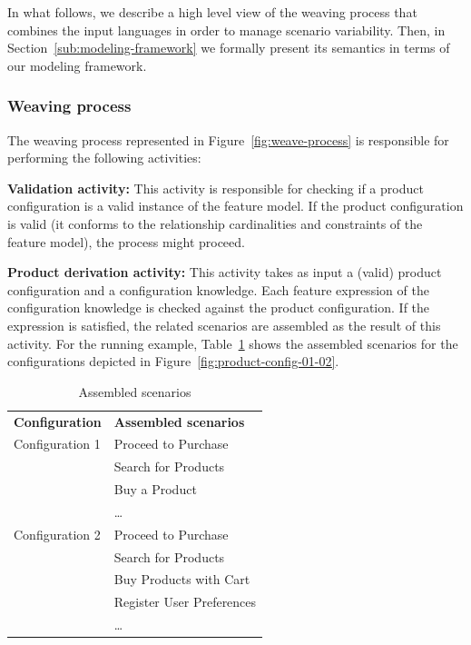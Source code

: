 \documentclass{acm_proc_article-sp}
\begin{document}
In what follows, we describe a high level view of the weaving process that combines the input languages in order to manage scenario variability.  Then, in Section~\ref{sub:modeling-framework} we formally present its semantics in terms of our modeling framework. 

\subsubsection{Weaving process}

The weaving process represented in Figure~\ref{fig:weave-process} is responsible for performing the following activities: 

{\bf Validation activity:} This activity is responsible for checking if a product configuration is a valid instance of the feature model. If the product configuration is 
valid (it conforms to the relationship cardinalities and constraints of the feature model), the process might proceed. 

{\bf Product derivation activity:} This activity takes as input a (valid) product configuration and a configuration knowledge. 
Each feature expression of the configuration knowledge is checked against the product configuration. If the expression 
is satisfied, the related scenarios are assembled as the result of this activity. For the running example, 
Table~\ref{tab:assembled-scenarios} shows the assembled scenarios for the configurations depicted in Figure~\ref{fig:product-config-01-02}.

\begin{table}[h]
\begin{center}
\caption{Assembled scenarios} \label{tab:assembled-scenarios}
\begin{tabular}{ll}
   \hline\noalign{\smallskip}
  {\bf Configuration} & {\bf Assembled scenarios} \\
   \noalign{\smallskip}
   \hline
   \noalign{\smallskip}
    Configuration 1\hspace{15pt} & Proceed to Purchase \\
                                                   & Search for Products \\
                                                   & Buy a Product \\
                             			  & \ldots \\
   Configuration 2                        & Proceed to Purchase \\
                             			  & Search for Products	 \\
			                           & Buy Products with Cart \\
                                                   & Register User Preferences \\
                             & \ldots       \\
  \hline
\end{tabular}
\end{center}
\end{table}
 
\end{document}
